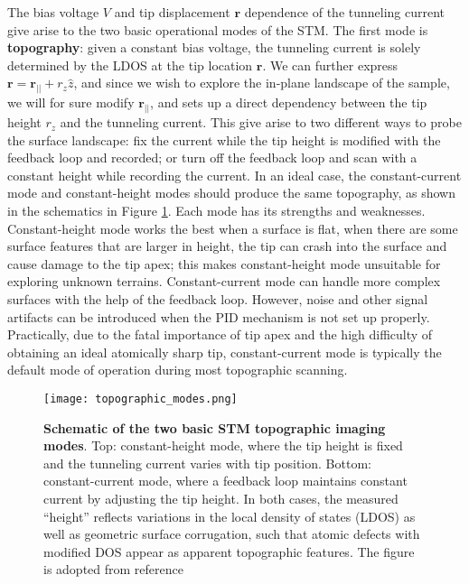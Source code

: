 \noindent The bias voltage $V$ and tip displacement $\mathbf{r}$ dependence of the tunneling current give arise to the two basic operational modes of the \ac{STM}. The first mode is \textbf{topography}: given a constant bias voltage, the tunneling current is solely determined by the \ac{LDOS} at the tip location $\mathbf{r}$. We can further express $\mathbf{r} = \mathbf{r_{||}} + r_z \hat{z}$, and since we wish to explore the in-plane landscape of the sample, we will for sure modify $\mathbf{r_{||}}$, and sets up a direct dependency between the tip height $r_z$ and the tunneling current. This give arise to two different ways to probe the surface landscape: fix the current while the tip height is modified with the feedback loop and recorded; or turn off the feedback loop and scan with a constant height while recording the current. In an ideal case, the constant-current mode and constant-height modes should produce the same topography, as shown in the schematics in Figure \ref{fig:topo_modes}. Each mode has its strengths and weaknesses. Constant-height mode works the best when a surface is flat, when there are some surface features that are larger in height, the tip can crash into the surface and cause damage to the tip apex; this makes constant-height mode unsuitable for exploring unknown terrains. Constant-current mode can handle more complex surfaces with the help of the feedback loop. However, noise and other signal artifacts can be introduced when the PID mechanism is not set up properly. Practically, due to the fatal importance of tip apex and the high difficulty of obtaining an ideal atomically sharp tip, constant-current mode is typically the default mode of operation during most topographic scanning. 

\begin{figure}
	\centering
	\texttt{[image: topographic\_modes.png]}
	\caption[\textbf{Schematic of the two basic STM topographic imaging modes}]{\textbf{Schematic of the two basic STM topographic imaging modes}. Top: constant-height mode, where the tip height is fixed and the tunneling current varies with tip position. Bottom: constant-current mode, where a feedback loop maintains constant current by adjusting the tip height. In both cases, the measured “height” reflects variations in the local density of states (LDOS) as well as geometric surface corrugation, such that atomic defects with modified DOS appear as apparent topographic features. The figure is adopted from reference \cite{stuartScanningTunnellingMicroscopy2021}}
	\label{fig:topo_modes}
\end{figure}

